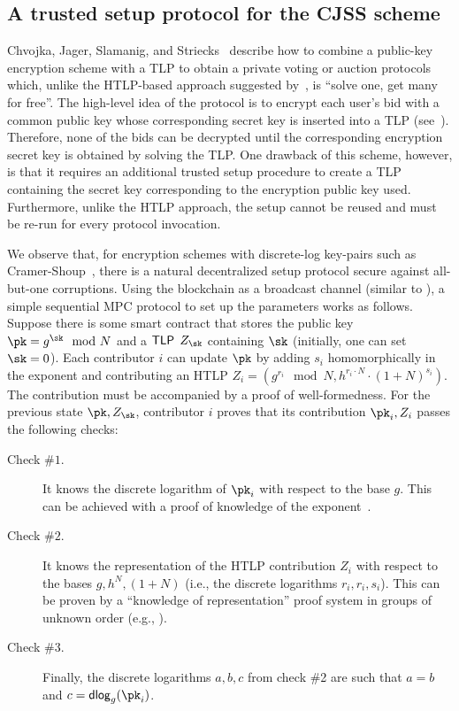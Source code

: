 \subsection{A trusted setup protocol for the CJSS scheme}\label{sec:seq_mpc_tlp}

Chvojka, Jager, Slamanig, and Striecks~\cite{ESORICS:CJSS21} describe how to combine a public-key encryption scheme with a TLP to obtain a private voting or auction protocols which, unlike the HTLP-based approach suggested by~\cite{C:MalThy19}, is ``solve one, get many for free''. The high-level idea of the protocol is to encrypt each user's bid with a common public key whose corresponding secret key is inserted into a TLP (see~). Therefore, none of the bids can be decrypted until the corresponding encryption secret key is obtained by solving the TLP. One drawback of this scheme, however, is that it requires an additional trusted setup procedure to create a TLP containing the secret key corresponding to the encryption public key used. Furthermore, unlike the HTLP approach, the setup cannot be reused and must be re-run for every protocol invocation.




We observe that, for encryption schemes with discrete-log key-pairs such as Cramer-Shoup~\cite{C:CraSho98}, there is a natural decentralized setup protocol secure against all-but-one corruptions. Using the blockchain as a broadcast channel (similar to \cite{ACNS:NRBB24}), a simple sequential MPC protocol to set up the parameters works as follows. Suppose there is some smart contract that stores the public key $\pk=g^{\sk} \mod{N}$ and a $\mathsf{TLP}$ $Z_{\sk}$ containing $\sk$ (initially, one can set $\sk = 0$). Each contributor $i$ can update $\pk$ by adding $s_i$ homomorphically in the exponent and contributing an HTLP $Z_i=(g^{r_i}\mod{N},h^{r_i\cdot N}\cdot(1+N)^{s_i})$. The contribution must be accompanied by a proof of well-formedness. For the previous state $\pk, Z_{\sk}$, contributor $i$ proves that its contribution $\pk_i, Z_i$ passes the following checks:

\begin{description}
    \item[Check $\#1$.] It knows the discrete logarithm of $\pk_i$ with respect to the base $g$. This can be achieved with a proof of knowledge of the exponent~\cite{C:Schnorr89}.
    \item[Check $\#2$.]\label{item:check2} It knows the representation of the HTLP contribution $Z_i$ with respect to the bases $g, h^N, (1+N)$ (i.e., the discrete logarithms $r_i, r_i, s_i$). This can be proven by a ``knowledge of representation'' proof system in groups of unknown order (e.g., \cite{C:BonBunFis19}).
    \item[Check $\#3$.] Finally, the discrete logarithms $a,b,c$ from check \#2 are such that $a=b$ and $c={\sf dlog}_g(\pk_i)$.
\end{description}

